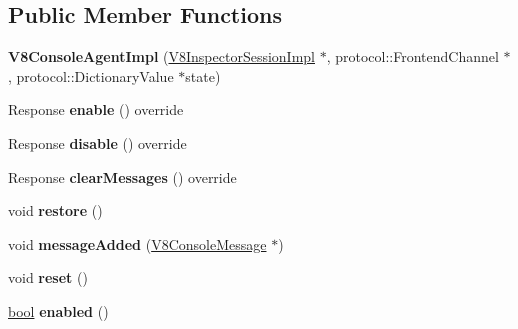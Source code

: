\subsection*{Public Member Functions}
\begin{DoxyCompactItemize}
\item 
\mbox{\label{classv8__inspector_1_1V8ConsoleAgentImpl_a99bc24784488a4ec0925d23383df3931}} 
{\bfseries V8\+Console\+Agent\+Impl} (\mbox{\hyperlink{classv8__inspector_1_1V8InspectorSessionImpl}{V8\+Inspector\+Session\+Impl}} $\ast$, protocol\+::\+Frontend\+Channel $\ast$, protocol\+::\+Dictionary\+Value $\ast$state)
\item 
\mbox{\label{classv8__inspector_1_1V8ConsoleAgentImpl_a78b50953ed92d7a4b48b5c13bddb5755}} 
Response {\bfseries enable} () override
\item 
\mbox{\label{classv8__inspector_1_1V8ConsoleAgentImpl_a1f15222d35a7b36d1a2cc3c0cf1c8ac6}} 
Response {\bfseries disable} () override
\item 
\mbox{\label{classv8__inspector_1_1V8ConsoleAgentImpl_aee268b1e10841e7f0cf31559772ad0a8}} 
Response {\bfseries clear\+Messages} () override
\item 
\mbox{\label{classv8__inspector_1_1V8ConsoleAgentImpl_a97d8d726388ce732cda43a91f50bd7fd}} 
void {\bfseries restore} ()
\item 
\mbox{\label{classv8__inspector_1_1V8ConsoleAgentImpl_a19ee7153e91f89f23995ab56cd196f7f}} 
void {\bfseries message\+Added} (\mbox{\hyperlink{classv8__inspector_1_1V8ConsoleMessage}{V8\+Console\+Message}} $\ast$)
\item 
\mbox{\label{classv8__inspector_1_1V8ConsoleAgentImpl_a3a304c066d94ac83ae27eed044d5c0bf}} 
void {\bfseries reset} ()
\item 
\mbox{\label{classv8__inspector_1_1V8ConsoleAgentImpl_a59902ce08341ebdad818ce9adef3ed36}} 
\mbox{\hyperlink{classbool}{bool}} {\bfseries enabled} ()
\end{DoxyCompactItemize}


